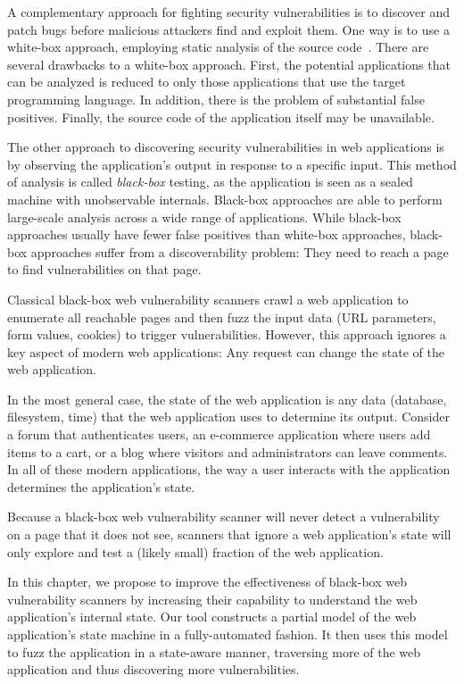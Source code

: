 A complementary approach for fighting security vulnerabilities is to discover and
patch bugs before malicious attackers find and exploit them. One way is to use
a white-box approach, employing static analysis of the source
code~\cite{felmetsger10:logic,huang03:web,jovanovic10:static,balzarotti08:saner}.
There are several drawbacks to a white-box approach. First, the potential
applications that can be analyzed is reduced to only those applications that
use the target programming language. In addition, there is the problem of
substantial false positives. Finally, the source code of the
application itself may be unavailable.

The other approach to discovering security vulnerabilities in web applications
is by observing the application's output in response to a specific input. This
method of analysis is called \emph{black-box} testing, as the application is
seen as a sealed machine with unobservable internals. Black-box approaches are
able to perform large-scale analysis across a wide range of applications. While
black-box approaches usually have fewer false positives than white-box
approaches, black-box approaches suffer from a discoverability problem: They
need to reach a page to find vulnerabilities on that page.

Classical black-box web vulnerability scanners crawl a web application to
enumerate all reachable pages and then fuzz the input data (URL parameters,
form values, cookies) to trigger vulnerabilities. However, this approach
ignores a key aspect of modern web applications: Any request can change the state of the web application.

In the most general case, the state of the web application is any data
(database, filesystem, time) that the web application uses to determine
its output. Consider a forum that authenticates users, an e-commerce
application where users add items to a cart, or a blog where visitors and
administrators can leave comments. In all of these modern applications, the way
a user interacts with the application determines the application's state.

Because a black-box web vulnerability scanner will never detect a vulnerability
on a page that it does not see, scanners that ignore a web application's state
will only explore and test a (likely small) fraction of the web application.

In this chapter, we propose to improve the effectiveness of black-box web vulnerability scanners by
increasing their capability to understand the web application's internal state.
Our tool constructs a partial model of the web application's state machine in a
fully-automated fashion. It then uses this model to fuzz the application in a
state-aware manner, traversing more of the web application and thus discovering
more vulnerabilities.

